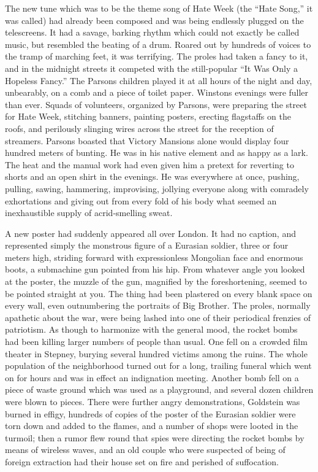 The new tune which was to be the theme song of Hate Week (the ``Hate
Song,'' it was called) had already been composed and was being endlessly
plugged on the telescreens. It had a savage, barking rhythm which could
not exactly be called music, but resembled the beating of a drum. Roared
out by hundreds of voices to the tramp of marching feet, it was
terrifying. The proles had taken a fancy to it, and in the midnight
streets it competed with the still-popular ``It Was Only a Hopeless
Fancy.'' The Parsons children played it at all hours of the night and
day, unbearably, on a comb and a piece of toilet paper.
Winston\textquotesingle s evenings were fuller than ever. Squads of
volunteers, organized by Parsons, were preparing the street for Hate
Week, stitching banners, painting posters, erecting flagstaffs on the
roofs, and perilously slinging wires across the street for the reception
of streamers. Parsons boasted that Victory Mansions alone would display
four hundred meters of bunting. He was in his native element and as
happy as a lark. The heat and the manual work had even given him a
pretext for reverting to shorts and an open shirt in the evenings. He
was everywhere at once, pushing, pulling, sawing, hammering,
improvising, jollying everyone along with comradely exhortations and
giving out from every fold of his body what seemed an inexhaustible
supply of acrid-smelling sweat.

A new poster had suddenly appeared all over London. It had no caption,
and represented simply the monstrous figure of a Eurasian soldier, three
or four meters high, striding forward with expressionless Mongolian face
and enormous boots, a submachine gun pointed from his hip. From whatever
angle you looked at the poster, the muzzle of the gun, magnified by the
foreshortening, seemed to be pointed straight at you. The thing had been
plastered on every blank space on every wall, even outnumbering the
portraits of Big Brother. The proles, normally apathetic about the war,
were being lashed into one of their periodical frenzies of patriotism.
As though to harmonize with the general mood, the rocket bombs had been
killing larger numbers of people than usual. One fell on a crowded film
theater in Stepney, burying several hundred victims among the ruins. The
whole population of the neighborhood turned out for a long, trailing
funeral which went on for hours and was in effect an indignation
meeting. Another bomb fell on a piece of waste ground which was used as
a playground, and several dozen children were blown to pieces. There
were further angry demonstrations, Goldstein was burned in effigy,
hundreds of copies of the poster of the Eurasian soldier were torn down
and added to the flames, and a number of shops were looted in the
turmoil; then a rumor flew round that spies were directing the rocket
bombs by means of wireless waves, and an old couple who were suspected
of being of foreign extraction had their house set on fire and perished
of suffocation.

